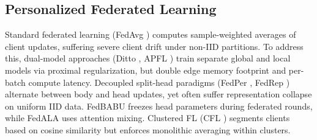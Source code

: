 \documentclass[sigconf]{acmart}
\begin{document}
\begin{table}[t]
\centering
\caption{\textbf{Taxonomy and Structural Trade-offs across Distributed Learning Paradigms.}}
\label{tab:taxonomy}
\vspace{1.5mm}
\end{table}

\subsection{Personalized Federated Learning}
Standard federated learning (FedAvg \cite{mcmahan2017communication}) computes sample-weighted averages of client updates, suffering severe client drift under non-IID partitions. To address this, dual-model approaches (Ditto \cite{li2021ditto}, APFL \cite{deng2020adaptive}) train separate global and local models via proximal regularization, but double edge memory footprint and per-batch compute latency. Decoupled split-head paradigms (FedPer \cite{arivazhagan2019federated}, FedRep \cite{collins2021exploiting}) alternate between body and head updates, yet often suffer representation collapse on uniform IID data. FedBABU \cite{oh2021fedbabu} freezes head parameters during federated rounds, while FedALA \cite{zhang2023fedala} uses attention mixing. Clustered FL (CFL \cite{sattler2020clustered}) segments clients based on cosine similarity but enforces monolithic averaging within clusters.
\end{document}
